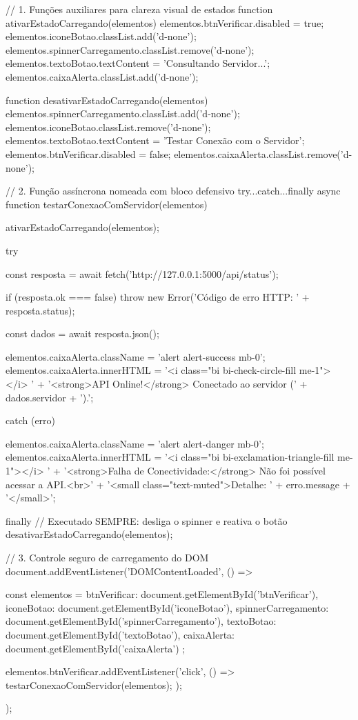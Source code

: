 \begin{boxCodigoJS}
// 1. Funções auxiliares para clareza visual de estados
function ativarEstadoCarregando(elementos) {
  elementos.btnVerificar.disabled = true;
  elementos.iconeBotao.classList.add('d-none');
  elementos.spinnerCarregamento.classList.remove('d-none');
  elementos.textoBotao.textContent = 'Consultando Servidor...';
  elementos.caixaAlerta.classList.add('d-none');
}

function desativarEstadoCarregando(elementos) {
  elementos.spinnerCarregamento.classList.add('d-none');
  elementos.iconeBotao.classList.remove('d-none');
  elementos.textoBotao.textContent = 'Testar Conexão com o Servidor';
  elementos.btnVerificar.disabled = false;
  elementos.caixaAlerta.classList.remove('d-none');
}

// 2. Função assíncrona nomeada com bloco defensivo try...catch...finally
async function testarConexaoComServidor(elementos) {
  ativarEstadoCarregando(elementos);

  try {
    const resposta = await fetch('http://127.0.0.1:5000/api/status');

    if (resposta.ok === false) {
      throw new Error('Código de erro HTTP: ' + resposta.status);
    }

    const dados = await resposta.json();

    elementos.caixaAlerta.className = 'alert alert-success mb-0';
    elementos.caixaAlerta.innerHTML =
      '<i class="bi bi-check-circle-fill me-1"></i> ' +
      '<strong>API Online!</strong> Conectado ao servidor (' +
      dados.servidor + ').';

  } catch (erro) {
    elementos.caixaAlerta.className = 'alert alert-danger mb-0';
    elementos.caixaAlerta.innerHTML =
      '<i class="bi bi-exclamation-triangle-fill me-1"></i> ' +
      '<strong>Falha de Conectividade:</strong> Não foi possível acessar a API.<br>' +
      '<small class="text-muted">Detalhe: ' + erro.message + '</small>';

  } finally {
    // Executado SEMPRE: desliga o spinner e reativa o botão
    desativarEstadoCarregando(elementos);
  }
}

// 3. Controle seguro de carregamento do DOM
document.addEventListener('DOMContentLoaded', () => {
  const elementos = {
    btnVerificar: document.getElementById('btnVerificar'),
    iconeBotao: document.getElementById('iconeBotao'),
    spinnerCarregamento: document.getElementById('spinnerCarregamento'),
    textoBotao: document.getElementById('textoBotao'),
    caixaAlerta: document.getElementById('caixaAlerta')
  };

  elementos.btnVerificar.addEventListener('click', () => {
    testarConexaoComServidor(elementos);
  });
});
\end{boxCodigoJS}

